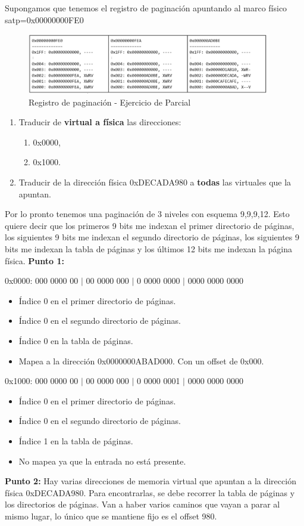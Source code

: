 \documentclass{article}
\begin{document}
Supongamos que tenemos el registro de paginación apuntando al marco físico satp=0x00000000FE0

\begin{figure}[h]
    \centering
    \includegraphics[width=0.95\textwidth]{src/ej4.1.png}
    \caption{Registro de paginación - Ejercicio de Parcial}
\end{figure}

\begin{enumerate}
    \item Traducir de \textbf{virtual a física} las direcciones:
    \begin{enumerate}
        \item 0x0000,
        \item 0x1000.
    \end{enumerate}
    \item Traducir de la dirección física 0xDECADA980 a \textbf{todas} las virtuales que la apuntan.
\end{enumerate}

Por lo pronto tenemos una paginación de 3 niveles con esquema 9,9,9,12. Esto quiere decir que los primeros 9 bits me indexan el primer directorio de páginas, los siguientes 9 bits me indexan el segundo directorio de páginas, los siguientes 9 bits me indexan la tabla de páginas y los últimos 12 bits me indexan la página física.
\textbf{Punto 1:}

0x0000: 000 0000 00 $|$ 00 0000 000 $|$ 0 0000 0000 $|$ 0000 0000 0000
\begin{itemize}
    \item Índice 0 en el primer directorio de páginas.
    \item Índice 0 en el segundo directorio de páginas.
    \item Índice 0 en la tabla de páginas.
    \item Mapea a la dirección 0x0000000ABAD000. Con un offset de 0x000.
\end{itemize}
0x1000: 000 0000 00 $|$ 00 0000 000 $|$ 0 0000 0001 $|$ 0000 0000 0000
\begin{itemize}
    \item Índice 0 en el primer directorio de páginas.
    \item Índice 0 en el segundo directorio de páginas.
    \item Índice 1 en la tabla de páginas.
    \item No mapea ya que la entrada no está presente.
\end{itemize}
\textbf{Punto 2:}
Hay varias direcciones de memoria virtual que apuntan a la dirección física 0xDECADA980. Para encontrarlas, se debe recorrer la tabla de páginas y los directorios de páginas. Van a haber varios caminos que vayan a parar al mismo lugar, lo único que se mantiene fijo es el offset 980.
\end{document}
